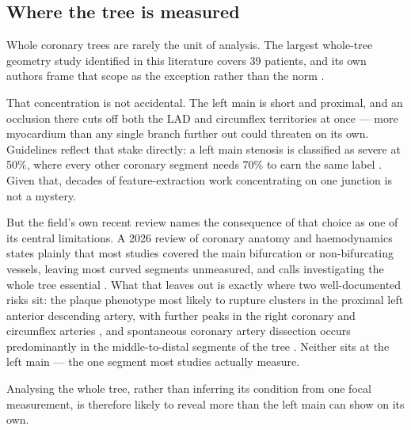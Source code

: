 
\subsection{Where the tree is measured}
\label{sec:gap-where}

Whole coronary trees are rarely the unit of analysis.
The largest whole-tree geometry study identified in this literature covers 39 patients, and its
own authors frame that scope as the exception rather than the norm \cite{zhang2024curvature}.

That concentration is not accidental.
The left main is short and proximal, and an occlusion there cuts off both the LAD and circumflex
territories at once --- more myocardium than any single branch further out could threaten on its
own. Guidelines reflect that stake directly: a left main stenosis is classified as severe at 50\%,
where every other coronary segment needs 70\% to earn the same label \cite{knuuti2019esc}. Given
that, decades of feature-extraction work concentrating on one junction is not a mystery.

But the field's own recent review names the consequence of that choice as one of its central
limitations. A 2026 review of coronary anatomy and haemodynamics states plainly that most studies
covered the main bifurcation or non-bifurcating vessels, leaving most curved segments unmeasured,
and calls investigating the whole tree essential \cite{shen2026geometry}. What that leaves out is
exactly where two well-documented risks sit: the plaque phenotype most likely to rupture clusters
in the proximal left anterior descending artery, with further peaks in the right coronary and
circumflex arteries \cite{araki2020plaques}, and spontaneous coronary artery dissection occurs
predominantly in the middle-to-distal segments of the tree \cite{inoue2021scad}. Neither sits at
the left main --- the one segment most studies actually measure.

Analysing the whole tree, rather than inferring its condition from one focal measurement, is
therefore likely to reveal more than the left main can show on its own.
